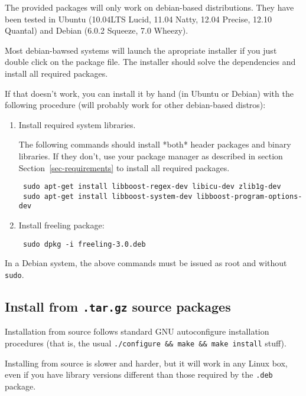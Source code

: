 \documentclass[a4paper]{book}
\begin{document}
The provided packages will only work on debian-based distributions.
They have been tested in Ubuntu (10.04LTS Lucid, 11.04 Natty, 12.04
Precise, 12.10 Quantal) and Debian (6.0.2 Squeeze, 7.0 Wheezy).

Most debian-bawsed systems will launch the apropriate installer if you
just double click on the package file. The installer should solve the
dependencies and install all required packages.

If that doesn't work, you can install it by hand (in Ubuntu or Debian) 
with the following procedure (will probably work for other debian-based distros):
 
\begin{enumerate}
\item Install required system libraries.

The following commands should install *both* header packages and
binary libraries. If they don't, use your package manager as described
in section Section~\ref{sec-requirements} to install all required packages.
\begin{verbatim}
 sudo apt-get install libboost-regex-dev libicu-dev zlib1g-dev
 sudo apt-get install libboost-system-dev libboost-program-options-dev
\end{verbatim}

\item Install freeling package:
\begin{verbatim}
 sudo dpkg -i freeling-3.0.deb
\end{verbatim}
\end{enumerate}

\noindent In a Debian system, the above commands must be issued as
root and without {\tt sudo}.

\subsection{Install from {\tt .tar.gz} source packages}
\label{sec-install-tgz}

 Installation from source follows standard GNU autoconfigure
 installation procedures (that is, the usual
 \verb#./configure && make && make install# stuff).

 Installing from source is slower and harder, but it will work in any
 Linux box, even if you have library versions different than those
 required by the {\tt .deb} package.
\end{document}
